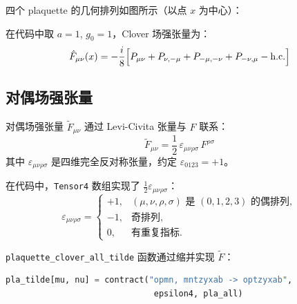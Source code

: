 \documentclass[11pt,a4paper]{ctexart}
\newcommand{\Ftmunu}{\tilde{F}_{\mu\nu}}
\newcommand{\eps}{\varepsilon}
\begin{document}
四个 plaquette 的几何排列如图所示（以点 $x$ 为中心）：
\begin{center}
\end{center}

在代码中取 $a=1$, $g_0=1$，Clover 场强张量为：
\begin{equation}
\hat{F}_{\mu\nu}(x) = -\frac{i}{8} \Bigl[
P_{\mu\nu} + P_{\nu,-\mu} + P_{-\mu,-\nu} + P_{-\nu,\mu}
- \text{h.c.} \Bigr]
\end{equation}

\subsection{对偶场强张量}

对偶场强张量 $\Ftmunu$ 通过 Levi-Civita 张量与 $F$ 联系：
\begin{equation}\label{eq:dual_F}
\Ftmunu = \frac{1}{2}\,\eps_{\mu\nu\rho\sigma}\,F^{\rho\sigma}
\end{equation}
其中 $\eps_{\mu\nu\rho\sigma}$ 是四维完全反对称张量，约定 $\eps_{0123}=+1$。

在代码中，\texttt{Tensor4} 数组实现了 $\tfrac{1}{2}\eps_{\mu\nu\rho\sigma}$：
\begin{equation}
\eps_{\mu\nu\rho\sigma} = \begin{cases}
+1, & (\mu,\nu,\rho,\sigma)\text{ 是 }(0,1,2,3)\text{ 的偶排列},\\
-1, & \text{奇排列},\\
0,  & \text{有重复指标}.
\end{cases}
\end{equation}

\texttt{plaquette\_clover\_all\_tilde} 函数通过缩并实现 $\tilde{F}$：
\begin{lstlisting}[language=Python]
pla_tilde[mu, nu] = contract("opmn, mntzyxab -> optzyxab",
                              epsilon4, pla_all)
\end{lstlisting}
\end{document}
